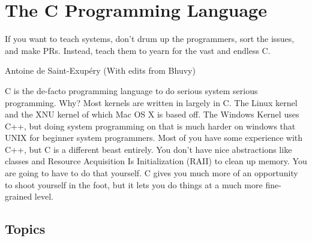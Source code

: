 \chapter{The C Programming Language}

\epigraph{If you want to teach systems, don't drum up the programmers, sort the issues, and make PRs. Instead, teach them to yearn for the vast and endless C.}{Antoine de Saint-Exup\'{e}ry (With edits from Bhuvy)}

\gls{C} is the de-facto programming language to do serious system serious programming.
Why? Most kernels are written in largely in C.
The \gls{Linux kernel} \cite{Love} and the XNU kernel \citet{xnukernel} of which Mac OS X is based off.
The Windows Kernel uses C++, but doing system programming on that is much harder on windows that UNIX for beginner system programmers.
Most of you have some experience with C++, but C is a different beast entirely.
You don't have nice abstractions like classes and Resource Acquisition Is Initialization (RAII) to clean up memory.
You are going to have to do that yourself.
C gives you much more of an opportunity to shoot yourself in the foot, but it lets you do things at a much more fine-grained level.













\section{Topics}

